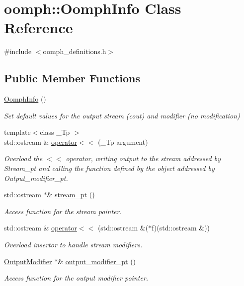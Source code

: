 \hypertarget{classoomph_1_1OomphInfo}{}\section{oomph\+:\+:Oomph\+Info Class Reference}
\label{classoomph_1_1OomphInfo}


{\ttfamily \#include $<$oomph\+\_\+definitions.\+h$>$}

\subsection*{Public Member Functions}
\begin{DoxyCompactItemize}
\item 
\hyperlink{classoomph_1_1OomphInfo_a9182d6aa7f2fa04a4acb899ade6949e0}{Oomph\+Info} ()
\begin{DoxyCompactList}\small\item\em Set default values for the output stream (cout) and modifier (no modification) \end{DoxyCompactList}\item 
{\footnotesize template$<$class \+\_\+\+Tp $>$ }\\std\+::ostream \& \hyperlink{classoomph_1_1OomphInfo_aa2e50922c77991309f88aaf0440a78db}{operator$<$$<$} (\+\_\+\+Tp argument)
\begin{DoxyCompactList}\small\item\em Overload the $<$$<$ operator, writing output to the stream addressed by Stream\+\_\+pt and calling the function defined by the object addressed by Output\+\_\+modifier\+\_\+pt. \end{DoxyCompactList}\item 
std\+::ostream $\ast$\& \hyperlink{classoomph_1_1OomphInfo_a4734a15b11ec273352643fc4f3594217}{stream\+\_\+pt} ()
\begin{DoxyCompactList}\small\item\em Access function for the stream pointer. \end{DoxyCompactList}\item 
std\+::ostream \& \hyperlink{classoomph_1_1OomphInfo_a01f770fe14e9f8882dea064e5f4dd1c6}{operator$<$$<$} (std\+::ostream \&($\ast$f)(std\+::ostream \&))
\begin{DoxyCompactList}\small\item\em Overload insertor to handle stream modifiers. \end{DoxyCompactList}\item 
\hyperlink{classoomph_1_1OutputModifier}{Output\+Modifier} $\ast$\& \hyperlink{classoomph_1_1OomphInfo_a0ab0a9107331f457e354f47ea26cc772}{output\+\_\+modifier\+\_\+pt} ()
\begin{DoxyCompactList}\small\item\em Access function for the output modifier pointer. \end{DoxyCompactList}\end{DoxyCompactItemize}
